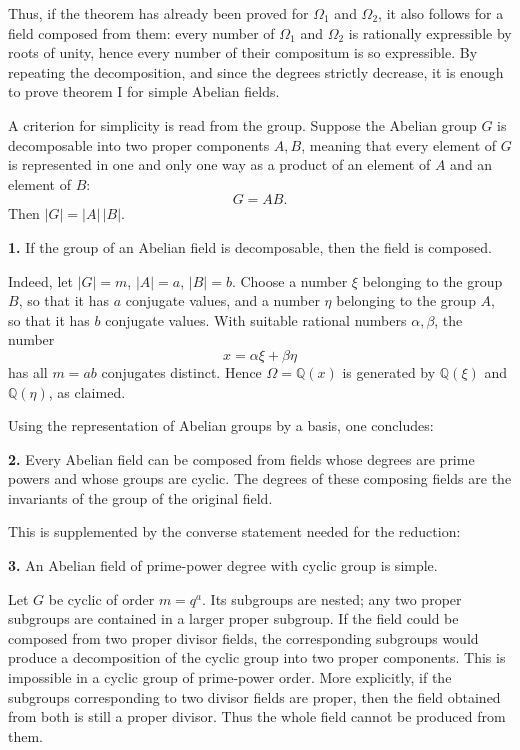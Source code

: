 \documentclass[11pt,a4paper]{book}
\begin{document}
Thus, if the theorem has already been proved for \(\Omega_1\) and \(\Omega_2\), it also follows for a field composed from them: every number of \(\Omega_1\) and \(\Omega_2\) is rationally expressible by roots of unity, hence every number of their compositum is so expressible.  By repeating the decomposition, and since the degrees strictly decrease, it is enough to prove theorem I for simple Abelian fields.

A criterion for simplicity is read from the group.  Suppose the Abelian group \(G\) is decomposable into two proper components \(A,B\), meaning that every element of \(G\) is represented in one and only one way as a product of an element of \(A\) and an element of \(B\):
\[
  G=AB.
\tag{2}
\]
Then \(|G|=|A|\,|B|\).

\textbf{1.} If the group of an Abelian field is decomposable, then the field is composed.

Indeed, let \(|G|=m\), \(|A|=a\), \(|B|=b\).  Choose a number \(\xi\) belonging to the group \(B\), so that it has \(a\) conjugate values, and a number \(\eta\) belonging to the group \(A\), so that it has \(b\) conjugate values.  With suitable rational numbers \(\alpha,\beta\), the number
\[
  x=\alpha\xi+\beta\eta
\]
has all \(m=ab\) conjugates distinct.  Hence \(\Omega=\mathbb Q(x)\) is generated by \(\mathbb Q(\xi)\) and \(\mathbb Q(\eta)\), as claimed.

Using the representation of Abelian groups by a basis, one concludes:

\textbf{2.} Every Abelian field can be composed from fields whose degrees are prime powers and whose groups are cyclic.  The degrees of these composing fields are the invariants of the group of the original field.

This is supplemented by the converse statement needed for the reduction:

\textbf{3.} An Abelian field of prime-power degree with cyclic group is simple.

Let \(G\) be cyclic of order \(m=q^a\).  Its subgroups are nested; any two proper subgroups are contained in a larger proper subgroup.  If the field could be composed from two proper divisor fields, the corresponding subgroups would produce a decomposition of the cyclic group into two proper components.  This is impossible in a cyclic group of prime-power order.  More explicitly, if the subgroups corresponding to two divisor fields are proper, then the field obtained from both is still a proper divisor.  Thus the whole field cannot be produced from them.
\end{document}

